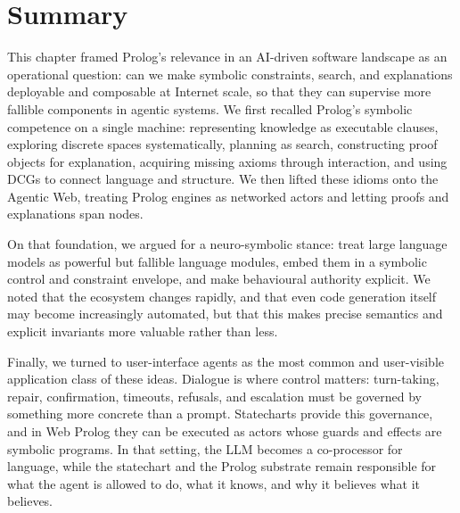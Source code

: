 \section{Summary}
\label{sec:summary-and-discussion}

This chapter framed Prolog's relevance in an AI-driven software landscape as an operational question: can we make symbolic constraints, search, and explanations deployable and composable at Internet scale, so that they can supervise more fallible components in agentic systems. We first recalled Prolog's symbolic competence on a single machine: representing knowledge as executable clauses, exploring discrete spaces systematically, planning as search, constructing proof objects for explanation, acquiring missing axioms through interaction, and using DCGs to connect language and structure. We then lifted these idioms onto the Agentic Web, treating Prolog engines as networked actors and letting proofs and explanations span nodes.

On that foundation, we argued for a neuro-symbolic stance: treat large language models as powerful but fallible language modules, embed them in a symbolic control and constraint envelope, and make behavioural authority explicit. We noted that the ecosystem changes rapidly, and that even code generation itself may become increasingly automated, but that this makes precise semantics and explicit invariants more valuable rather than less.

Finally, we turned to user-interface agents as the most common and user-visible application class of these ideas. Dialogue is where control matters: turn-taking, repair, confirmation, timeouts, refusals, and escalation must be governed by something more concrete than a prompt. Statecharts provide this governance, and in Web Prolog they can be executed as actors whose guards and effects are symbolic programs. In that setting, the LLM becomes a co-processor for language, while the statechart and the Prolog substrate remain responsible for what the agent is allowed to do, what it knows, and why it believes what it believes.




